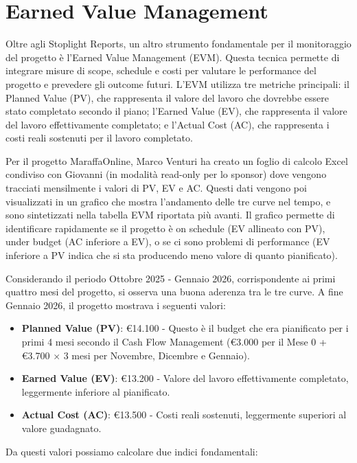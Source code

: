 \section{Earned Value Management}

Oltre agli Stoplight Reports, un altro strumento fondamentale per il monitoraggio del progetto è l'Earned Value Management (EVM). Questa tecnica permette di integrare misure di scope, schedule e costi per valutare le performance del progetto e prevedere gli outcome futuri. L'EVM utilizza tre metriche principali: il Planned Value (PV), che rappresenta il valore del lavoro che dovrebbe essere stato completato secondo il piano; l'Earned Value (EV), che rappresenta il valore del lavoro effettivamente completato; e l'Actual Cost (AC), che rappresenta i costi reali sostenuti per il lavoro completato.

Per il progetto MaraffaOnline, Marco Venturi ha creato un foglio di calcolo Excel condiviso con Giovanni (in modalità read-only per lo sponsor) dove vengono tracciati mensilmente i valori di PV, EV e AC. Questi dati vengono poi visualizzati in un grafico che mostra l'andamento delle tre curve nel tempo, e sono sintetizzati nella tabella EVM riportata più avanti. Il grafico permette di identificare rapidamente se il progetto è on schedule (EV allineato con PV), under budget (AC inferiore a EV), o se ci sono problemi di performance (EV inferiore a PV indica che si sta producendo meno valore di quanto pianificato).

Considerando il periodo Ottobre 2025 - Gennaio 2026, corrispondente ai primi quattro mesi del progetto, si osserva una buona aderenza tra le tre curve. A fine Gennaio 2026, il progetto mostrava i seguenti valori:

\begin{itemize}
    \item \textbf{Planned Value (PV)}: €14.100 - Questo è il budget che era pianificato per i primi 4 mesi secondo il Cash Flow Management (€3.000 per il Mese 0 + €3.700 $\times$ 3 mesi per Novembre, Dicembre e Gennaio).
    \item \textbf{Earned Value (EV)}: €13.200 - Valore del lavoro effettivamente completato, leggermente inferiore al pianificato.
    \item \textbf{Actual Cost (AC)}: €13.500 - Costi reali sostenuti, leggermente superiori al valore guadagnato.
\end{itemize}

Da questi valori possiamo calcolare due indici fondamentali:

